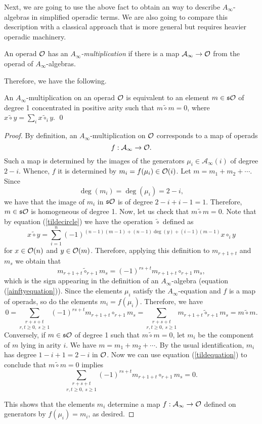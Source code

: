 \documentclass[Thesis.tex]{subfiles}
\begin{document}
Next, we are going to use the above fact to obtain an way to describe $A_\infty$-algebras in simplified operadic terms. We are also going to compare this description with a classical approach that is more general but requires heavier operadic machinery. 


\begin{defin}\label{ainftymult}
An operad ${\mathcal O}$ has an \emph{$A_\infty$-multiplication} if there is a map $\mathcal{A}_\infty\to{\mathcal O}$ from the operad of $A_\infty$-algebras.
\end{defin}

 Therefore, we have the following. 

\begin{lem}\label{twisting}
An $A_\infty$-multiplication on an operad ${\mathcal O}$ is equivalent to an element $m\in\mathfrak{s}{\mathcal O}$ of degree 1 concentrated in positive arity such that $m\tilde{\circ}m=0$, where $x\tilde{\circ} y=\sum_i x\tilde{\circ}_i y$. \qed
\end{lem}
\begin{proof}
By definition, an $A_\infty$-multiplication on ${\mathcal O}$ corresponds to a map of operads \[f:\mathcal{A}_\infty\to{\mathcal O}.\] Such a map is determined by the images of the generators $\mu_i\in\mathcal{A}_\infty(i)$ of degree $2-i$. Whence, $f$ it is determined by $m_i=f(\mu_i)\in{\mathcal O}(i)$. Let $m=m_1+m_2+\cdots$. Since \[\deg(m_i)=\deg(\mu_i)=2-i,\]
we have that the image of $m_i$ in $\mathfrak{s}{\mathcal O}$ is of degree $2-i+i-1=1$. Therefore, $m\in\mathfrak{s}{\mathcal O}$ is homogeneous of degree 1. Now, let us check that $m\tilde{\circ}m=0$. Note that by equation (\ref{tildecircle}) we have the operation $\tilde{\circ}$ defined as
\[x\tilde{\circ}y=\sum_{i=1}^n(-1)^{(n-1)(m-1)+(n-1)\deg(y)+(i-1)(m-1)}x\circ_i y\]
for $x\in{\mathcal O}(n)$ and $y\in{\mathcal O}(m)$. Therefore, applying this definition to $m_{r+1+t}$ and $m_s$ we obtain that
\begin{equation}\label{tildequation}
m_{r+1+t}\tilde{\circ }_{r+1}m_s=(-1)^{rs+t}m_{r+1+t}\circ_{r+1} m_s,
\end{equation}
which is the sign appearing in the definition of an $A_\infty$-algebra (equation (\ref{ainftyequation})). Since the elements $\mu_i$ satisfy the $A_\infty$-equation and $f$ is a map of operads, so do the elements $m_i=f(\mu_i)$. Therefore, we have
\[0=\underset{r,t\geq 0,\ s\geq 1}{\sum_{r+s+t}}(-1)^{rs+t}m_{r+1+t}\circ_{r+1} m_s=\underset{r,t\geq 0,\ s\geq 1}{\sum_{r+s+t}}m_{r+1+t}\tilde{\circ}_{r+1}m_s=m\tilde{\circ}m.\] 
Conversely, if $m\in\mathfrak{s}{\mathcal O}$ of degree 1 such that $m\tilde{\circ}m=0$, let $m_i$ be the component of $m$ lying in arity $i$. We have $m=m_1+m_2+\cdots$. By the usual identification, $m_i$ has degree $1-i+1=2-i$ in ${\mathcal O}$. Now we can use equation (\ref{tildequation}) to conclude that $m\tilde{\circ}m=0$ implies 
\[\underset{r,t\geq 0,\ s\geq 1}{\sum_{r+s+t}}(-1)^{rs+t}m_{r+1+t}\circ_{r+1} m_s=0.\]

This shows that the elements $m_i$ determine a map $f:\mathcal{A}_\infty\to{\mathcal O}$ defined on generators by $f(\mu_i)=m_i$, as desired. 
\end{proof}
\end{document}
